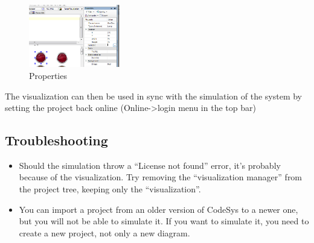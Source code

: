 \documentclass[10pt,a4paper]{article}
\begin{document}
\begin{figure}[h!]
	\begin{center}
		\includegraphics[width=150px]{img12.png}
	\end{center}
\caption{Properties}
\label{fig:prop}
\end{figure}

The visualization can then be used in sync with the simulation of the system by setting the project back online (Online->login menu in the top bar)

\subsection{Troubleshooting}
\begin{itemize}
	\item Should the simulation throw a ``License not found'' error, it's probably because of the visualization.
	Try removing the ``visualization manager'' from the project tree, keeping only the ``visualization''.

	\item You can import a project from an older version of CodeSys to a newer one, but you will not be able to simulate it.
	If you want to simulate it, you need to create a new project, not only a new diagram.
\end{itemize}
\end{document}
